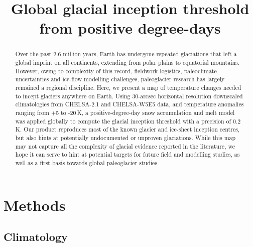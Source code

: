 \documentclass[manuscript]{copernicus}
\title{Global glacial inception threshold from positive degree-days}
\affil[1]{Department of Water and Climate, Vrije Universiteit Brussel, Brussels, Belgium}
\begin{document}

\maketitle

\begin{abstract}

    Over the past 2.6 million years, Earth has undergone repeated glaciations
    that left a global imprint on all continents, extending from polar plains
    to equatorial mountains. However, owing to complexity of this record,
    fieldwork logistics, paleoclimate uncertainties and ice-flow modelling
    challenges, paleoglacier research has largely remained a regional
    discipline.
    Here, we present a map of temperature changes needed to incept glaciers
    anywhere on Earth. Using 30-arcsec horizontal resolution downscaled
    climatologies from CHELSA-2.1 and CHELSA-W5E5 data, and temperature
    anomalies ranging from +5 to -20\,K, a positive-degree-day snow
    accumulation and melt model was applied globally to compute the glacial
    inception threshold with a precision of 0.2\,K.
    Our product reproduces most of the known glacier and ice-sheet inception
    centres, but also hints at potentially undocumented or unproven
    glaciations. While this map may not capture all the complexity of glacial
    evidence reported in the literature, we hope it can serve to hint at
    potential targets for future field and modelling studies, as well as a
    first basis towards global paleoglacier studies.

\end{abstract}


\introduction

\section{Methods}

\subsection{Climatology}
\end{document}
